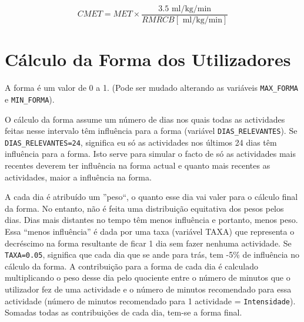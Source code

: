 \documentclass[a4paper,10pt]{report}
\begin{document}
\begin{equation} \label{eq:CMET} 
CMET = MET \times \frac{3.5 \text{ ml/kg/min}}{RMRCB [\text{ ml/kg/min}]}
\end{equation}

\chapter{Cálculo da Forma dos Utilizadores}
\label{cap:forma}
A forma é um valor de 0 a 1. (Pode ser mudado alterando as variáveis \verb!MAX_FORMA! e \verb!MIN_FORMA!).

O cálculo da forma assume um número de dias nos quais todas as actividades feitas nesse intervalo têm influência para a forma 
(variável \verb!DIAS_RELEVANTES!). Se \verb!DIAS_RELEVANTES=24!, significa eu só as actividades nos últimos 24 dias têm influência para a forma.  
Isto serve para simular o facto de só as actividades mais recentes deverem ter influência na forma actual e quanto mais recentes as 
actividades, maior a influência na forma.

A cada dia é atribuído um ''peso``, o quanto esse dia vai valer para o cálculo final da forma. 
No entanto, não é feita uma distribuição equitativa dos pesos pelos dias. Dias mais distantes no tempo têm menos influência e portanto, 
menos peso. Essa “menos influência” é dada por uma taxa (variável TAXA) que representa o decréscimo na forma resultante de ficar 1 dia sem 
fazer nenhuma actividade. Se \verb!TAXA=0.05!, significa que cada dia que se ande para trás, tem -5\% de influência no cálculo da forma.
A contribuição para a forma de cada dia é calculado multiplicando o peso desse dia pelo quociente entre o número de minutos que o utilizador 
fez de uma actividade e o número de minutos recomendado para essa actividade (número de minutos recomendado para 1 actividade = \verb!Intensidade!). 
Somadas todas as contribuições de cada dia, tem-se a forma final.
\end{document}
